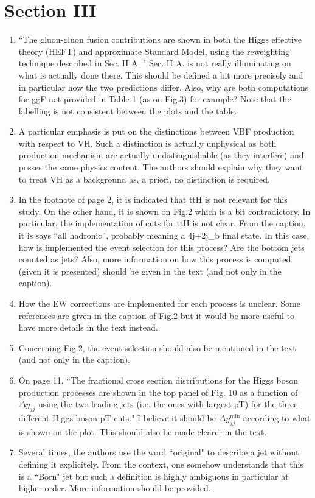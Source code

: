 \documentclass[12pt]{article}
\begin{document}
\section*{Section III}
\begin{enumerate}
\item ``The gluon-gluon fusion contributions are shown in both the Higgs effective theory (HEFT) and approximate Standard Model, using the reweighting technique described in Sec. II A. " Sec. II A. is not really illuminating on what is actually done there. This should be defined a bit more precisely and in particular how the two predictions differ. Also, why are both computations for ggF not provided in Table 1 (as on Fig.3) for example? Note that the labelling is not consistent between the plots and the table.
\item A particular emphasis is put on the distinctions between VBF production with respect to VH. Such a distinction is actually unphysical as both production mechanism are actually undistinguishable (as they interfere) and posses the same physics content. The authors should explain why they want to treat VH as a background as, a priori, no distinction is required.
\item In the footnote of page 2, it is indicated that ttH is not relevant for this study. On the other hand, it is shown on Fig.2 which is a bit contradictory. In particular, the implementation of cuts for ttH is not clear. From the caption, it is says “all hadronic”, probably meaning a 4j+2j\_b final state. In this case, how is implemented the event selection for this process? Are the bottom jets counted as jets? Also, more information on how this process is computed (given it is presented) should be given in the text (and not only in the caption).
\item How the EW corrections are implemented for each process is unclear. Some references are given in the caption of Fig.2 but it would be more useful to have more details in the text instead.
\item Concerning Fig.2, the event selection should also be mentioned in the text (and not only in the caption).
\item On page 11, ``The fractional cross section distributions for the Higgs boson production processes are shown in the top panel of Fig. 10 as a function of $\Delta y_{jj}$ using the two leading jets (i.e. the ones with largest pT) for the three different Higgs boson pT cuts." I believe it should be $\Delta y_{jj}^{\text{min}}$ according to what is shown on the plot. This should also be made clearer in the text.
\item Several times, the authors use the word ``original" to describe a jet without defining it explicitely. From the context, one somehow understands that this is a ``Born" jet but such a definition is highly ambiguous in particular at higher order. More information should be provided.
\end{enumerate}
\end{document}
